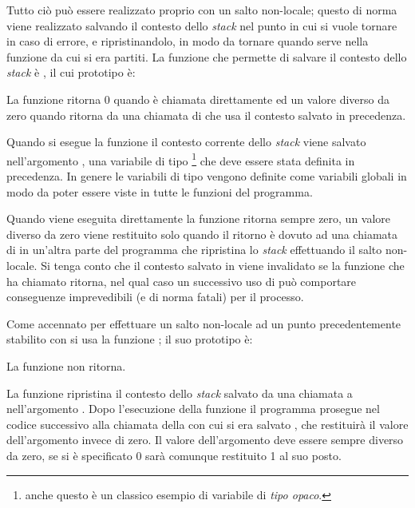 Tutto ciò può essere realizzato proprio con un salto non-locale; questo di
norma viene realizzato salvando il contesto dello \textit{stack} nel punto in
cui si vuole tornare in caso di errore, e ripristinandolo, in modo da tornare
quando serve nella funzione da cui si era partiti.  La funzione che permette
di salvare il contesto dello \textit{stack} è , il cui prototipo
è:

\begin{funcproto}{ 
}
{La funzione ritorna $0$ quando è chiamata direttamente ed un valore diverso
  da zero quando ritorna da una chiamata di  che usa il contesto
  salvato in precedenza.}
\end{funcproto}
  
Quando si esegue la funzione il contesto corrente dello \textit{stack} viene
salvato nell'argomento , una variabile di tipo
\footnote{anche questo è un classico esempio di variabile di
  \textsl{tipo opaco}.}  che deve essere stata definita in precedenza. In
genere le variabili di tipo  vengono definite come variabili
globali in modo da poter essere viste in tutte le funzioni del programma.

Quando viene eseguita direttamente la funzione ritorna sempre zero, un valore
diverso da zero viene restituito solo quando il ritorno è dovuto ad una
chiamata di  in un'altra parte del programma che ripristina lo
\textit{stack} effettuando il salto non-locale. Si tenga conto che il contesto
salvato in  viene invalidato se la funzione che ha chiamato
 ritorna, nel qual caso un successivo uso di  può
comportare conseguenze imprevedibili (e di norma fatali) per il processo.
  
Come accennato per effettuare un salto non-locale ad un punto precedentemente
stabilito con  si usa la funzione ; il suo
prototipo è:

\begin{funcproto}{ 
}
{La funzione non ritorna.}   
\end{funcproto}

La funzione ripristina il contesto dello \textit{stack} salvato da una
chiamata a  nell'argomento . Dopo l'esecuzione della
funzione il programma prosegue nel codice successivo alla chiamata della
 con cui si era salvato , che restituirà il valore
dell'argomento  invece di zero.  Il valore
dell'argomento  deve essere sempre diverso da zero, se si è
specificato 0 sarà comunque restituito 1 al suo posto.

